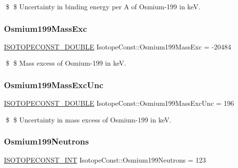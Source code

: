 \$ \$ Uncertainty in binding energy per A of Osmium-\/199 in keV. \mbox{\label{group___isotope_const-_osmium-_os199_ga3b02853f1d2b7966b8464911ecbd0ffb}} 
\subsubsection{\texorpdfstring{Osmium199\+Mass\+Exc}{Osmium199MassExc}}
{\footnotesize\ttfamily \mbox{\hyperlink{group___isotope_const-_macros_ga8f45a7272ce02c0b4c65c44636ed719a}{I\+S\+O\+T\+O\+P\+E\+C\+O\+N\+S\+T\+\_\+\+D\+O\+U\+B\+LE}} Isotope\+Const\+::\+Osmium199\+Mass\+Exc = -\/20484}

\$ \$ Mass excess of Osmium-\/199 in keV. \mbox{\label{group___isotope_const-_osmium-_os199_gad635cb0757b1dc4a0fb08529264366fc}} 
\subsubsection{\texorpdfstring{Osmium199\+Mass\+Exc\+Unc}{Osmium199MassExcUnc}}
{\footnotesize\ttfamily \mbox{\hyperlink{group___isotope_const-_macros_ga8f45a7272ce02c0b4c65c44636ed719a}{I\+S\+O\+T\+O\+P\+E\+C\+O\+N\+S\+T\+\_\+\+D\+O\+U\+B\+LE}} Isotope\+Const\+::\+Osmium199\+Mass\+Exc\+Unc = 196}

\$ \$ Uncertainty in mass excess of Osmium-\/199 in keV. \mbox{\label{group___isotope_const-_osmium-_os199_gab718c7104a82600b6e9117e9c964b769}} 
\subsubsection{\texorpdfstring{Osmium199\+Neutrons}{Osmium199Neutrons}}
{\footnotesize\ttfamily \mbox{\hyperlink{group___isotope_const-_macros_ga5f18360b3e99483a35c32d789e62621c}{I\+S\+O\+T\+O\+P\+E\+C\+O\+N\+S\+T\+\_\+\+I\+NT}} Isotope\+Const\+::\+Osmium199\+Neutrons = 123}

